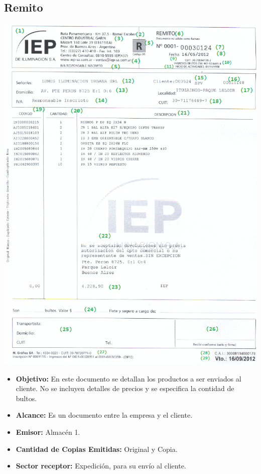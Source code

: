 \subsection{Remito}
\begin{center}
 \includegraphics[scale=0.90,keepaspectratio=true]{./Images/FormulariosIEP/Remito.png}
\end{center}
\begin{itemize}
  \item \textbf{Objetivo:} En este documento se detallan los productos a ser enviados al cliente. No se incluyen detalles de precios y se especifica la contidad de bultos.
  \item \textbf{Alcance:} Es un documento entre la empresa y el cliente.
  \item \textbf{Emisor:} Almac\'en 1.
  \item \textbf{Cantidad de Copias Emitidas:} Original y Copia.
  \item \textbf{Sector receptor:} Expedici\'on, para su env\'io al cliente.
 \end{itemize}
